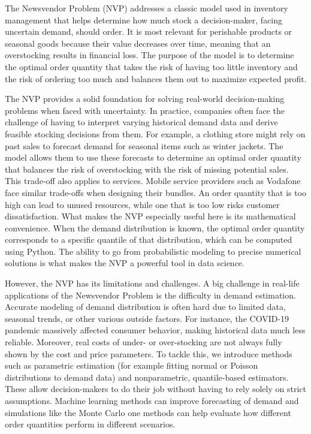 \noindent The Newsvendor Problem (NVP) addresses a classic model used in inventory management that helps determine how much stock a decision-maker, facing uncertain demand, should order. It is most relevant for perishable products or seasonal goods because their value decreases over time, meaning that an overstocking results in financial loss. The purpose of the model is to determine the optimal order quantity that takes the risk of having too little inventory and the risk of ordering too much and balances them out to maximize expected profit.

The NVP provides a solid foundation for solving real-world decision-making problems when faced with uncertainty. In practice, companies often face the challenge of having to interpret varying historical demand data and derive feasible stocking decisions from them. For example, a clothing store might rely on past sales to forecast demand for seasonal items such as winter jackets. The model allows them to use these forecasts to determine an optimal order quantity that balances the risk of overstocking with the risk of missing potential sales. This trade-off also applies to services. Mobile service providers such as Vodafone face similar trade-offs when designing their bundles. An order quantity that is too high can lead to unused resources, while one that is too low risks customer dissatisfaction. What makes the NVP especially useful here is its mathematical convenience. When the demand distribution is known, the optimal order quantity corresponds to a specific quantile of that distribution, which can be computed using Python. The ability to go from probabilistic modeling to precise numerical solutions is what makes the NVP a powerful tool in data science.

However, the NVP has its limitations and challenges. A big challenge in real-life applications of the Newsvendor Problem is the difficulty in demand estimation. Accurate modeling of demand distribution is often hard due to limited data, seasonal trends, or other various outside factors. For instance, the COVID-19 pandemic massively affected consumer behavior, making historical data much less reliable. Moreover, real costs of under- or over-stocking are not always fully shown by the cost and price parameters. To tackle this, we introduce methods such as parametric estimation (for example fitting normal or Poisson distributions to demand data) and nonparametric, quantile-based estimators. These allow decision-makers to do their job without having to rely solely on strict assumptions. Machine learning methods can improve forecasting of demand and simulations like the Monte Carlo one methods can help evaluate how different order quantities perform in different scenarios. 

